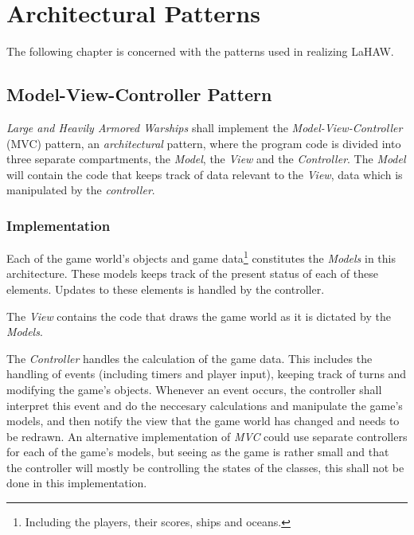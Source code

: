 \chapter{Architectural Patterns}
The following chapter is concerned with the patterns used in realizing LaHAW.


    \section{Model-View-Controller Pattern}
    \emph{Large and Heavily Armored Warships} shall implement the \emph{Model-View-Controller} (MVC) pattern, an \emph{architectural} pattern, where the program code is divided into three separate compartments, the \emph{Model}, the \emph{View} and the \emph{Controller}. The \emph{Model} will contain the code that keeps track of data relevant to the \emph{View}, data which is manipulated by the \emph{controller}.
    
        \subsection{Implementation}
        Each of the game world's objects and game data\footnote{Including the players, their scores, ships and oceans.} constitutes the \emph{Models} in this architecture. These models keeps track of the present status of each of these elements. Updates to these elements is handled by the controller.
    
        The \emph{View} contains the code that draws the game world as it is dictated by the \emph{Models}.
    
        The \emph{Controller} handles the calculation of the game data. This includes the handling of events (including timers and player input), keeping track of turns and modifying the game's objects.
        Whenever an event occurs, the controller shall interpret this event and do the neccesary calculations and manipulate the game's models, and then notify the view that the game world has changed and needs to be redrawn.
        An alternative implementation of \emph{MVC} could use separate controllers for each of the game's models, but seeing as the game is rather small and that the controller will mostly be controlling the states of the classes, this shall not be done in this implementation.


